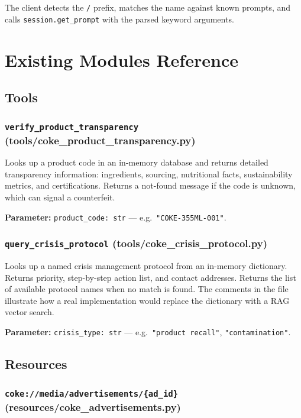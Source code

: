 \documentclass[11pt, a4paper]{article}
\begin{document}
The client detects the \texttt{/} prefix, matches the name against known prompts, and calls \texttt{session.get\_prompt} with the parsed keyword arguments.

\section{Existing Modules Reference}

\subsection{Tools}

\subsubsection{\texttt{verify\_product\_transparency} (tools/coke\_product\_transparency.py)}

Looks up a product code in an in-memory database and returns detailed transparency information: ingredients, sourcing, nutritional facts, sustainability metrics, and certifications. Returns a not-found message if the code is unknown, which can signal a counterfeit.

\textbf{Parameter:} \texttt{product\_code: str} — e.g.\ \texttt{"COKE-355ML-001"}.

\subsubsection{\texttt{query\_crisis\_protocol} (tools/coke\_crisis\_protocol.py)}

Looks up a named crisis management protocol from an in-memory dictionary. Returns priority, step-by-step action list, and contact addresses. Returns the list of available protocol names when no match is found. The comments in the file illustrate how a real implementation would replace the dictionary with a RAG vector search.

\textbf{Parameter:} \texttt{crisis\_type: str} — e.g.\ \texttt{"product recall"}, \texttt{"contamination"}.

\subsection{Resources}

\subsubsection{\texttt{coke://media/advertisements/\{ad\_id\}} (resources/coke\_advertisements.py)}
\end{document}
